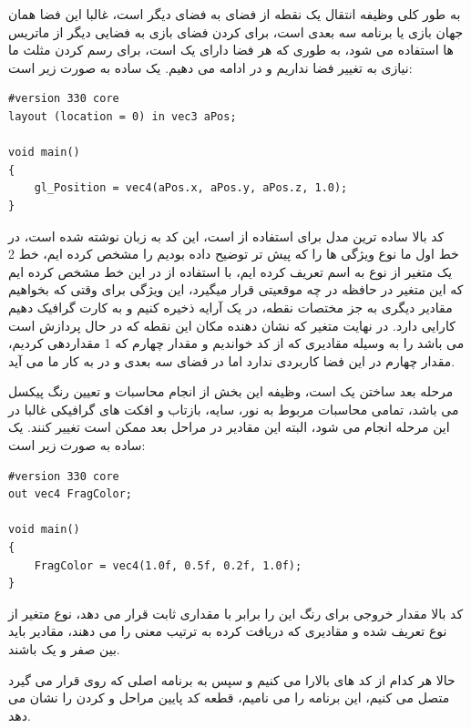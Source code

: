 \documentclass[a4paper, 12pt]{book}
\newcommand{\lrit}[1]{\lr{\textit{#1}}}
\begin{document}
    به طور کلی وظیفه \lrit{Vertex Shader} انتقال یک نقطه از فضای  به فضای دیگر است، غالبا این فضا همان جهان بازی یا برنامه سه بعدی است، برای  کردن فضای بازی به فضایی دیگر از ماتریس ها استفاده می شود، به طوری که هر فضا دارای یک   است، برای رسم کردن مثلث ما نیازی به تغییر فضا نداریم و در  ادامه می دهیم.
    یک  ساده به صورت زیر است:

    \begin{LTR}
    \small
        \begin{lstlisting}[style=C++Style,caption=\lrit{basic vertex shader}]
#version 330 core
layout (location = 0) in vec3 aPos;

void main()
{
    gl_Position = vec4(aPos.x, aPos.y, aPos.z, 1.0);
}
        \end{lstlisting}
    \end{LTR}
    \normalsize
    \vspace*{0.3cm}

    کد بالا ساده ترین مدل برای استفاده از  است، این کد به زبان  نوشته شده است، در خط اول ما نوع ویژگی ها را که پیش تر توضیح داده بودیم
    را مشخص کرده ایم، خط 2 یک متغیر از نوع  به اسم  تعریف کرده ایم، با استفاده از \lrit{layout (location = 0)} در این خط مشخص کرده ایم که این متغیر در حافظه در چه موقعیتی قرار میگیرد، این ویژگی برای وقتی که بخواهیم مقادیر دیگری به جز مختصات نقطه، در یک آرایه ذخیره کنیم و به کارت گرافیک دهیم کارایی دارد.
    در نهایت متغیر  که نشان دهنده مکان این نقطه که در حال پردازش است می باشد را به وسیله مقادیری که از کد   خواندیم و مقدار چهارم که 1 مقداردهی کردیم، مقدار چهارم در این فضا کاربردی ندارد اما در فضای سه بعدی و در  به کار ما می آید.\par
    مرحله بعد ساختن یک  است، وظیفه این بخش از  انجام محاسبات و تعیین رنگ پیکسل می باشد، تمامی محاسبات مربوط به نور، سایه، بازتاب و افکت های گرافیکی غالبا در این مرحله انجام می شود، البته این مقادیر در مراحل بعد ممکن است تغییر کنند.
    یک  ساده به صورت زیر است:

    \newpage
    \begin{LTR}
    \small
        \begin{lstlisting}[style=C++Style,caption=\lrit{basic fragment shader}]
#version 330 core
out vec4 FragColor;

void main()
{
    FragColor = vec4(1.0f, 0.5f, 0.2f, 1.0f);
}
        \end{lstlisting}
    \end{LTR}
    \normalsize
    \vspace*{0.3cm}
    کد بالا مقدار خروجی برای رنگ این  را برابر با مقداری ثابت قرار می دهد، نوع متغیر  از نوع  تعریف شده و مقادیری که دریافت کرده به ترتیب معنی  را می دهند، مقادیر باید بین صفر و یک باشند.\par
    حالا هر کدام از کد های بالارا  می کنیم و سپس به برنامه اصلی که روی  قرار می گیرد متصل می کنیم، این برنامه را  می نامیم، قطعه کد پایین مراحل  و  کردن  را نشان می دهد.
\end{document}
